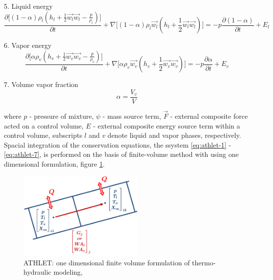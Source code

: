5. Liquid energy
\begin{equation} \label{eq:athlet-5}
\frac{\partial \Big[ (1-\alpha)\rho_{l}(h_{l} + \frac{1}{2} \vec{w_{l}} \vec{w_{l}} - \frac{p}{\rho_{l}}) \Big]}{\partial t} + \nabla \Big[ (1-\alpha)\rho_{l}\vec{w_{l}}(h_{l} + \frac{1}{2} \vec{w_{l}} \vec{w_{l}}) \Big] = - p \frac{\partial (1 - \alpha)}{\partial t} + E_{l}
\end{equation}


6. Vapor energy
\begin{equation} \label{eq:athlet-6}
\frac{\partial \Big[ \alpha \rho_{v}(h_{v} + \frac{1}{2} \vec{w_{v}} \vec{w_{v}} - \frac{p}{\rho_{v}}) \Big]}{\partial t} + \nabla \Big[ \alpha\rho_{v}\vec{w_{v}}(h_{v} + \frac{1}{2} \vec{w_{v}} \vec{w_{v}}) \Big] = - p \frac{\partial \alpha}{\partial t} + E_{v}
\end{equation}

7. Volume vapor fraction
\begin{equation} \label{eq:athlet-7}
	\alpha = \frac{V_{v}}{V}
\end{equation}


where $p$ - pressure of mixture, $\psi$ - mass source term, $\vec{F}$ - external composite force acted on a control volume, $E$ - external composite energy source term within a control volume, subscripts $l$ and $v$ denote liquid and vapor phases, respectively. \\


Spacial integration of the conservation equations, the ssystem \ref{eq:athlet-1} - \ref{eq:athlet-7}, is performed on the basis of finite-volume method with using one dimensional formulation, figure \ref{fig:introduction-1d-fvm}.


\figpointer{\ref{fig:introduction-1d-fvm}}
\begin{figure}[htpb]
  \centering
  \includegraphics[width=0.55\textwidth]{figures/introduction-1d-fvm.png}
\caption{ATHLET: one dimensional finite volume formulation of thermo-hydraulic modeling, \cite{tims-presentation}}
\label{fig:introduction-1d-fvm}
\end{figure}


